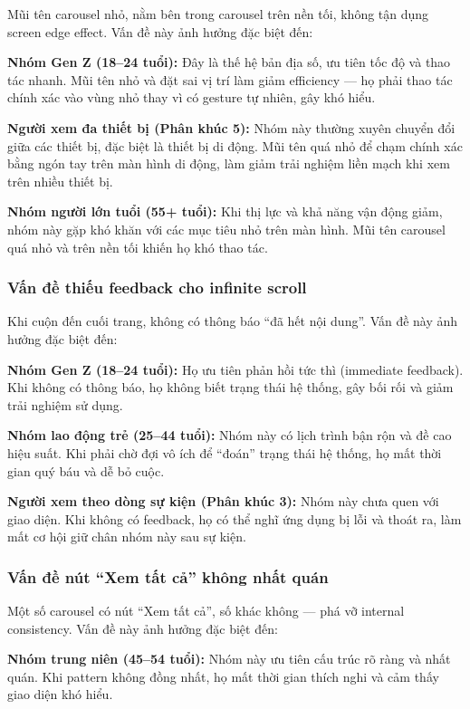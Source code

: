 Mũi tên carousel nhỏ, nằm bên trong carousel trên nền tối, không tận dụng screen edge effect. Vấn đề này ảnh hưởng đặc biệt đến:

\textbf{Nhóm Gen Z (18--24 tuổi):} Đây là thế hệ bản địa số, ưu tiên tốc độ và thao tác nhanh. Mũi tên nhỏ và đặt sai vị trí làm giảm efficiency --- họ phải thao tác chính xác vào vùng nhỏ thay vì có gesture tự nhiên, gây khó hiểu.

\textbf{Người xem đa thiết bị (Phân khúc 5):} Nhóm này thường xuyên chuyển đổi giữa các thiết bị, đặc biệt là thiết bị di động. Mũi tên quá nhỏ để chạm chính xác bằng ngón tay trên màn hình di động, làm giảm trải nghiệm liền mạch khi xem trên nhiều thiết bị.

\textbf{Nhóm người lớn tuổi (55+ tuổi):} Khi thị lực và khả năng vận động giảm, nhóm này gặp khó khăn với các mục tiêu nhỏ trên màn hình. Mũi tên carousel quá nhỏ và trên nền tối khiến họ khó thao tác.

\subsubsection{Vấn đề thiếu feedback cho infinite scroll}

Khi cuộn đến cuối trang, không có thông báo ``đã hết nội dung''. Vấn đề này ảnh hưởng đặc biệt đến:

\textbf{Nhóm Gen Z (18--24 tuổi):} Họ ưu tiên phản hồi tức thì (immediate feedback). Khi không có thông báo, họ không biết trạng thái hệ thống, gây bối rối và giảm trải nghiệm sử dụng.

\textbf{Nhóm lao động trẻ (25--44 tuổi):} Nhóm này có lịch trình bận rộn và đề cao hiệu suất. Khi phải chờ đợi vô ích để ``đoán'' trạng thái hệ thống, họ mất thời gian quý báu và dễ bỏ cuộc.

\textbf{Người xem theo dòng sự kiện (Phân khúc 3):} Nhóm này chưa quen với giao diện. Khi không có feedback, họ có thể nghĩ ứng dụng bị lỗi và thoát ra, làm mất cơ hội giữ chân nhóm này sau sự kiện.

\subsubsection{Vấn đề nút ``Xem tất cả'' không nhất quán}

Một số carousel có nút ``Xem tất cả'', số khác không --- phá vỡ internal consistency. Vấn đề này ảnh hưởng đặc biệt đến:

\textbf{Nhóm trung niên (45--54 tuổi):} Nhóm này ưu tiên cấu trúc rõ ràng và nhất quán. Khi pattern không đồng nhất, họ mất thời gian thích nghi và cảm thấy giao diện khó hiểu.

